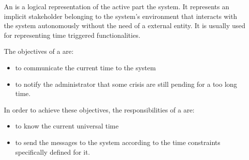 An  is a logical representation of the active part the \msricrash system. It represents an implicit stakeholder belonging to the system's environment that interacts with the \msricrash system autonomously without the need of a external entity. It is usually used for representing time triggered functionalities.

The objectives of a  are:
\begin{itemize}
  \item to communicate the current time to the system
  \item to notify the administrator that some crisis are still pending for a too long time.
\end{itemize}
\vspace{0.5cm}
In order to achieve these objectives, the responsibilities of a  are:
\begin{itemize}
  \item to know the current universal time
  \item to send the messages to the system according to the time constraints specifically defined for it.
\end{itemize}


